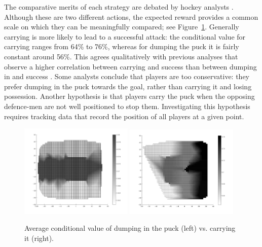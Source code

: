 The comparative merits of each strategy are debated by hockey analysts \citep{Tulsky2013a}. Although these are two different actions, the expected reward provides a common scale on which they can be meaningfully compared; see Figure~\ref{fig:dump-values}. Generally carrying is more likely to lead to a successful attack: the conditional value for carrying ranges from 64\% to 76\%, whereas for dumping the puck it is fairly constant around 56\%. This agrees qualitatively with previous analyses that observe a higher correlation between carrying and success than between dumping in and success \citep{Tulsky2013a}. Some analysts conclude that players are too conservative: they prefer dumping in the puck towards the goal, rather than carrying it and losing possession. 
Another hypothesis is that players carry the puck when the opposing defence-men are not well positioned to stop them. Investigating this hypothesis requires tracking data that record the position of all players at a given point.

\begin{figure}
\centering 
\includegraphics[width=0.48\textwidth]{dumpinCond2d.png}
\includegraphics[width=0.48\textwidth]{carryCond2d.png}
\caption{Average conditional value of dumping in the puck (left) vs. carrying it (right).}
\label{fig:dump-values}
\end{figure}


